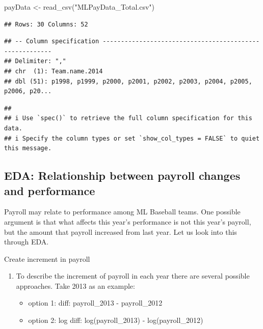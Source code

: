 \documentclass[
]{article}
\newenvironment{Shaded}{\begin{snugshade}}{\end{snugshade}}
\newcommand{\FunctionTok}[1]{\textcolor[rgb]{0.00,0.00,0.00}{#1}}
\newcommand{\NormalTok}[1]{#1}
\newcommand{\OtherTok}[1]{\textcolor[rgb]{0.56,0.35,0.01}{#1}}
\newcommand{\StringTok}[1]{\textcolor[rgb]{0.31,0.60,0.02}{#1}}
\providecommand{\tightlist}{%
  \setlength{\itemsep}{0pt}\setlength{\parskip}{0pt}}
\begin{document}
\begin{Shaded}
\begin{Highlighting}[]
\NormalTok{payData }\OtherTok{\textless{}{-}} \FunctionTok{read\_csv}\NormalTok{(}\StringTok{"MLPayData\_Total.csv"}\NormalTok{)}
\end{Highlighting}
\end{Shaded}

\begin{verbatim}
## Rows: 30 Columns: 52
\end{verbatim}

\begin{verbatim}
## -- Column specification --------------------------------------------------------
## Delimiter: ","
## chr  (1): Team.name.2014
## dbl (51): p1998, p1999, p2000, p2001, p2002, p2003, p2004, p2005, p2006, p20...
\end{verbatim}

\begin{verbatim}
## 
## i Use `spec()` to retrieve the full column specification for this data.
## i Specify the column types or set `show_col_types = FALSE` to quiet this message.
\end{verbatim}

\hypertarget{eda-relationship-between-payroll-changes-and-performance}{%
\subsection{EDA: Relationship between payroll changes and
performance}\label{eda-relationship-between-payroll-changes-and-performance}}

Payroll may relate to performance among ML Baseball teams. One possible
argument is that what affects this year's performance is not this year's
payroll, but the amount that payroll increased from last year. Let us
look into this through EDA.

Create increment in payroll

\begin{enumerate}
\def\labelenumi{\roman{enumi}.}
\item
  To describe the increment of payroll in each year there are several
  possible approaches. Take 2013 as an example:

  \begin{itemize}
  \tightlist
  \item
    option 1: diff: payroll\_2013 - payroll\_2012
  \item
    option 2: log diff: log(payroll\_2013) - log(payroll\_2012)
  \end{itemize}
\end{enumerate}
\end{document}
